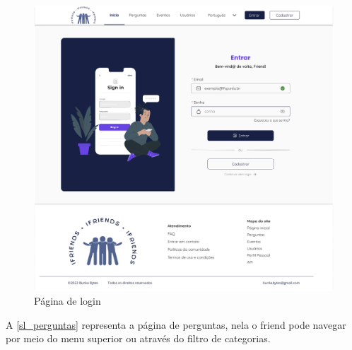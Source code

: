 \begin{figure}[htb]
\centering
\caption{\label{login} Página de login}
\includegraphics[width=1\textwidth]{anexos/Imagens_Prototipo/intro/login.png}
\end{figure}
\FloatBarrier

A \autoref{sl_perguntas} representa a página de perguntas, nela o \gls{friend} pode navegar por meio do menu superior ou através do filtro de categorias. 

